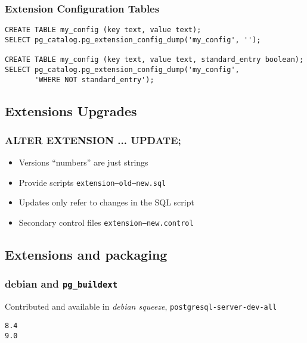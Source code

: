 \documentclass[english]{beamer}
\begin{document}
\begin{frame}[fragile]
  \frametitle{Extension Configuration Tables}

  \begin{example}
\begin{verbatim}
CREATE TABLE my_config (key text, value text);
SELECT pg_catalog.pg_extension_config_dump('my_config', '');

CREATE TABLE my_config (key text, value text, standard_entry boolean);
SELECT pg_catalog.pg_extension_config_dump('my_config',
       'WHERE NOT standard_entry');

\end{verbatim}
  \end{example}  
\end{frame}

\subsection{Extensions Upgrades}

\begin{frame}[fragile]
  \frametitle{ALTER EXTENSION ... UPDATE;}

  \begin{itemize}
    \item<1-> Versions ``numbers'' are just strings
    \item<2-> Provide scripts \texttt{extension--old--new.sql}
    \item<3-> Updates only refer to changes in the SQL script
    \item<4-> Secondary control files \texttt{extension--new.control}
  \end{itemize}

\end{frame}

\subsection{Extensions and packaging}

\begin{frame}[fragile]
  \frametitle{debian and \texttt{pg\_buildext}}

  Contributed and available in \textit{debian squeeze},
  \texttt{postgresql-server-dev-all}
  \linebreak

  \begin{example}
\begin{verbatim}
8.4
9.0
\end{verbatim}
  \end{example}
\end{frame}
\end{document}
